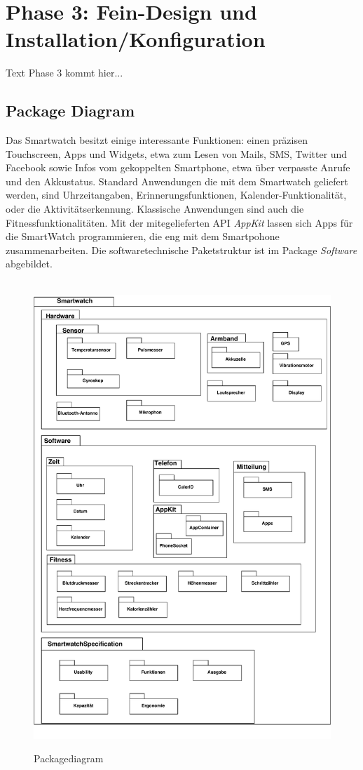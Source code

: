 \chapter{Phase 3: Fein-Design und Installation/Konfiguration}
Text Phase 3 kommt hier...

\section{Package Diagram}
Das Smartwatch besitzt einige interessante Funktionen: einen präzisen Touchscreen, Apps und Widgets, etwa zum Lesen von Mails, SMS, Twitter und Facebook sowie Infos vom gekoppelten Smartphone, etwa über verpasste Anrufe und den Akkustatus.
Standard Anwendungen die mit dem Smartwatch geliefert werden, sind Uhrzeitangaben, Erinnerungsfunktionen, Kalender-Funktionalität, oder die Aktivitätserkennung. 
Klassische Anwendungen sind auch die Fitnessfunktionalitäten.
Mit der mitegelieferten API \textit{AppKit} lassen sich Apps für die SmartWatch programmieren, die eng mit dem Smartpohone zusammenarbeiten.
Die softwaretechnische Paketstruktur ist im Package \textit{Software} abgebildet.

\begin{figure}[h]
\centering\
\includegraphics[width=\textwidth]{img/PackagePhase2}
\caption{Packagediagram}\label{fig:package}
\end{figure}

